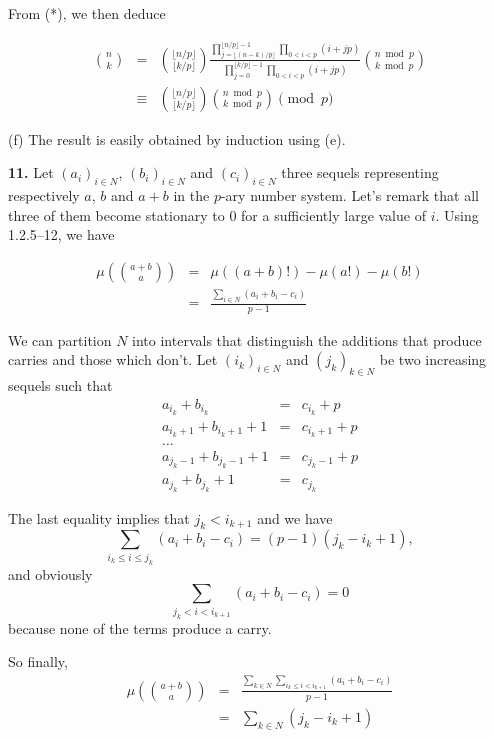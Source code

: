 \documentclass[a4paper,12pt]{article}
\newcommand{\newpar}[1]{\bigskip \noindent \textbf{#1.}}
\newcommand{\subpar}[1]{\medskip \noindent (#1)}
\begin{document}
From (*), we then deduce

\begin{eqnarray*}
  {n \choose k} &=& {{\lfloor n/p\rfloor} \choose {\lfloor k/p\rfloor}}
  \frac{\prod_{j=\lfloor (n-k)/p\rfloor}^{\lfloor
      n/p\rfloor-1}\prod_{0<i<p}(i+jp)} {\prod_{j=0}^{\lfloor
      k/p\rfloor-1}\prod_{0<i<p}(i+jp)} {{n\bmod p} \choose {k\bmod p}} \\
  &\equiv&  {{\lfloor n/p\rfloor} \choose {\lfloor k/p\rfloor}} {{n\bmod
    p} \choose {k\bmod p}} \pmod p
\end{eqnarray*}

\subpar{f} The result is easily obtained by induction using (e).

\newpar{11} Let $(a_i)_{i \in N}$, $(b_i)_{i \in N}$ and $(c_i)_{i \in
  N}$ three sequels representing respectively  $a$, $b$ and $a+b$ in
the $p$-ary number system.  Let's remark that all three of them become
stationary to $0$ for a sufficiently large value of $i$. Using
1.2.5--12, we have

\begin{eqnarray*}
  \mu\left( {{a+b} \choose a} \right) &=& \mu((a+b)!) - \mu(a!) - \mu(b!) \\
  &=& \frac{\sum_{i \in N} (a_i + b_i - c_i)}{p-1}
\end{eqnarray*}

We can partition $N$ into intervals that distinguish the additions
that produce carries and those which don't.  Let $(i_k)_{i \in N}$ and
$(j_k)_{k \in N}$ be two increasing sequels such that
\begin{eqnarray*}
  a_{i_k} + b_{i_k} &=& c_{i_k} + p \\
  a_{i_k+1} + b_{i_k + 1} + 1 &=& c_{i_k + 1} + p \\
  \ldots \\
  a_{j_k - 1} + b_{j_k - 1} + 1 &=& c_{j_k - 1} + p \\
  a_{j_k} + b_{j_k} + 1 &=& c_{j_k}
\end{eqnarray*}

The last equality implies that $j_k < i_{k+1}$ and we have
\[ \sum_{i_k \le i \le j_k} (a_i + b_i - c_i) = (p-1) (j_k - i_k +
1),\]
and obviously
\[ \sum_{j_k < i < i_{k+1}} (a_i + b_i - c_i) = 0\]
because none of the terms produce a carry.

So finally,
\begin{eqnarray*}
  \mu\left( {{a+b} \choose a}\right) &=& \frac{\sum_{k \in N} \sum_{i_k \le i
      < i_{k+1}} (a_i + b_i - c_i)}{p-1} \\
  &=& \sum_{k \in N} (j_k - i_k + 1)
\end{eqnarray*}
\end{document}
